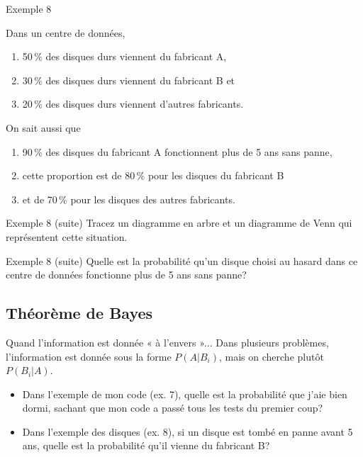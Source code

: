 \documentclass{BeamerTemplate}
\newcommand{\cibleReponse}{}
\newcommand{\lienreponse}[1]{\gdef\cibleReponse{#1}}
\begin{document}
\begin{frame}[t]{Exemple 8}

{\footnotesize Dans un centre de données,
\begin{enumerate}[$\bullet$]
\item 50\,\% des disques durs viennent du fabricant A,
\item 30\,\% des disques durs viennent du fabricant B et
\item 20\,\% des disques durs viennent d'autres fabricants.
\end{enumerate}

On sait aussi que
\begin{enumerate}[$\circ$]
\item 90\,\% des disques du fabricant A fonctionnent plus de 5 ans sans panne,
\item cette proportion est de 80\,\% pour les disques du fabricant B
\item et de 70\,\% pour les disques des autres fabricants.
\end{enumerate}

\bigskip

}
\end{frame}

\begin{frame}[t]{Exemple 8 (suite)}
Tracez un diagramme en arbre et un diagramme de Venn qui représentent cette situation.
 \vspace{7cm}
\end{frame}


\begin{frame}[t,label=ex8]{Exemple 8 (suite)}
Quelle est la probabilité qu'un disque choisi au hasard dans ce centre de données fonctionne plus de 5 ans sans panne?

 \vspace{5.6cm}


\lienreponse{rep-ex2}
\end{frame}

\subsection{Théorème de Bayes}

\begin{frame}[t]{Quand l'information est donnée « à l'envers »...}
 Dans plusieurs problèmes, l'information est donnée sous la forme $P(A|B_i)$,
 mais on cherche plutôt $P(B_i|A)$.

 \begin{itemize}\itemsep 1cm
  \item Dans l'exemple de mon code (ex. 7), quelle est la probabilité que j'aie
  bien dormi, sachant que mon code a passé tous les tests du premier coup?
  \item Dans l'exemple des disques (ex. 8), si un disque est tombé en panne
  avant 5 ans, quelle est la probabilité qu'il vienne du fabricant B?
 \end{itemize}
\end{frame}
\end{document}
